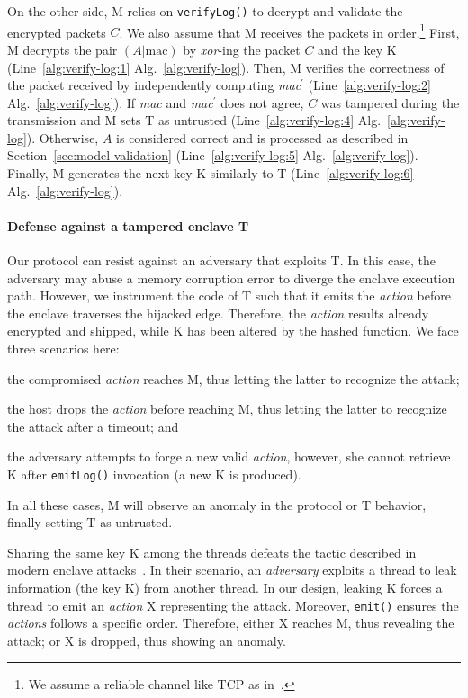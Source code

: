 On the other side, M relies on \texttt{verifyLog()} to decrypt and validate the 
encrypted packets $C$.
We also assume that M receives the packets in 
order.\footnote{We assume a reliable channel like TCP as in~\citep{scarr}.}
First, M decrypts the pair $(A|\text{mac})$ by \emph{xor}-ing the packet $C$ 
and the key K (Line~\ref{alg:verify-log:1} Alg.~\ref{alg:verify-log}).
Then, M verifies the correctness of the packet received by independently 
computing \emph{mac}$^\prime$ (Line~\ref{alg:verify-log:2} 
Alg.~\ref{alg:verify-log}).
If \emph{mac} and \emph{mac}$^\prime$ does not agree, $C$ was tampered during 
the transmission and M sets T as untrusted (Line~\ref{alg:verify-log:4} 
Alg.~\ref{alg:verify-log}).
Otherwise, $A$ is considered correct and is processed as described in 
Section~\ref{sec:model-validation} (Line~\ref{alg:verify-log:5}  
Alg.~\ref{alg:verify-log}).
Finally, M generates the next key K similarly to T 
(Line~\ref{alg:verify-log:6} Alg.~\ref{alg:verify-log}).

\paragraph{Defense against a tampered enclave T}
Our protocol can resist against an adversary that exploits T.
In this case, the adversary may abuse a memory corruption error to 
diverge the enclave execution path.
However, we instrument the code of T such that it emits the \emph{action} 
before the enclave traverses the hijacked edge.
Therefore, the \emph{action} results already encrypted and shipped, while K has 
been altered by the hashed function.
We face three scenarios here:
\begin{enumerate*}[label=(S\arabic*)]
	\item the compromised \emph{action} reaches M, thus letting the
	latter to recognize the attack;
	\item the host drops the \emph{action} before reaching M, thus letting the 
	latter to recognize the attack after a timeout; and
	\item the adversary attempts to forge a new valid \emph{action}, however, 
	she cannot retrieve K after \texttt{emitLog()} invocation (\ie a new K is 
	produced).
\end{enumerate*}
In all these cases, M will observe an anomaly in the protocol or T 
behavior, finally setting T as untrusted.

Sharing the same key K among the threads defeats the tactic described 
in modern enclave attacks~\citep{lee2017hacking}.
In their scenario, an \emph{adversary} exploits a thread
to leak information (\ie the key K) from another thread.
In our design, leaking K forces a thread to emit an \emph{action} X 
representing the attack. Moreover, \texttt{emit()} ensures the \emph{actions} 
follows a specific order. 
Therefore, either X reaches M, thus revealing the attack; or X is 
dropped, thus showing an anomaly.

